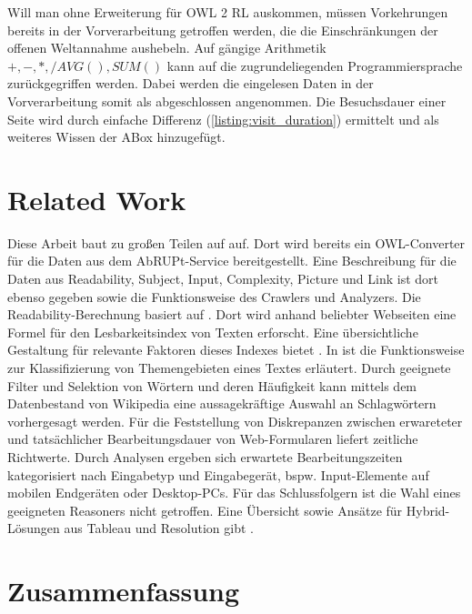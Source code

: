 \documentclass[runningheads,a4paper]{llncs}
\begin{document}
Will man ohne Erweiterung für OWL 2 RL auskommen, müssen Vorkehrungen bereits in der Vorverarbeitung getroffen werden, die die Einschränkungen der offenen Weltannahme aushebeln. 
Auf gängige Arithmetik \(+, -, *, / AVG(), SUM() \) kann auf die zugrundeliegenden Programmiersprache zurückgegriffen werden.
Dabei werden die eingelesen Daten in der Vorverarbeitung somit als abgeschlossen angenommen.
Die Besuchsdauer einer Seite wird durch einfache Differenz (\ref{listing:visit_duration}) ermittelt und als weiteres Wissen der ABox hinzugefügt.



\section{Related Work}
\label{sec:related_work}

Diese Arbeit baut zu großen Teilen auf \cite{Brieger} auf. 
Dort wird bereits ein OWL-Converter für die Daten aus dem AbRUPt-Service bereitgestellt.
Eine Beschreibung für die Daten aus Readability, Subject, Input, Complexity, Picture und Link ist dort ebenso gegeben sowie die Funktionsweise des Crawlers und Analyzers.
Die Readability-Berechnung basiert auf \cite{readability}. 
Dort wird anhand beliebter Webseiten eine Formel für den Lesbarkeitsindex von Texten erforscht.
Eine übersichtliche Gestaltung für relevante Faktoren dieses Indexes bietet \cite{lesbarkeit}.
In \cite{subject} ist die Funktionsweise zur Klassifizierung von Themengebieten eines Textes erläutert.
Durch geeignete Filter und Selektion von Wörtern und deren Häufigkeit kann mittels dem Datenbestand von Wikipedia eine aussagekräftige Auswahl an Schlagwörtern vorhergesagt werden.
Für die Feststellung von Diskrepanzen zwischen erwareteter und tatsächlicher Bearbeitungsdauer von Web-Formularen liefert \cite{web_forms} zeitliche Richtwerte.
Durch Analysen ergeben sich erwartete Bearbeitungszeiten kategorisiert nach Eingabetyp und Eingabegerät, bspw. Input-Elemente auf mobilen Endgeräten oder Desktop-PCs.
Für das Schlussfolgern ist die Wahl eines geeigneten Reasoners nicht getroffen.
Eine Übersicht sowie Ansätze für Hybrid-Lösungen aus Tableau und Resolution gibt \cite{hybrid_reasoning}.


\section{Zusammenfassung}
\label{sec:conclusion}
\end{document}
